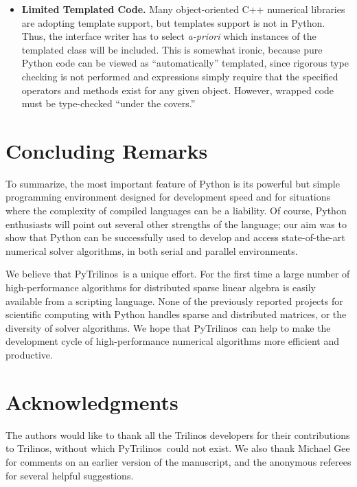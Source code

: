 \documentclass[acmtocl]{acmtrans2m}
\newcommand{\PyTrilinos}{{PyTrilinos}}
\begin{document}
\begin{itemize}
\item {\bf Limited Templated Code.} Many object-oriented C++ numerical
  libraries are adopting template support, but
  templates support is not in Python.  Thus, the interface
  writer has to select {\sl a-priori} which instances of the templated
  class will be included.  This is somewhat ironic, because pure
  Python code can be viewed as ``automatically'' templated, since
  rigorous type checking is not performed and expressions simply
  require that the specified operators and methods exist for any given
  object.  However, wrapped code must be type-checked ``under the
  covers.'' 

\end{itemize}

\section{Concluding Remarks}
\label{sec:concluding}

To summarize, the most important feature of Python is its powerful but
simple programming environment designed for development speed and for
situations where the complexity of compiled languages can be a
liability.  Of course, Python enthusiasts will point out several other
strengths of the language; our aim was to show that Python can be
successfully used to develop and access state-of-the-art numerical
solver algorithms, in both serial and parallel environments.

We believe that \PyTrilinos\ is a unique effort. For the first time
a large number of high-performance algorithms for distributed sparse
linear algebra is easily available from a scripting language.  None
of the previously reported projects for scientific computing with
Python handles sparse and distributed matrices, or the diversity of
solver algorithms.  We hope that \PyTrilinos\ can help to make the
development cycle of high-performance numerical algorithms more
efficient and productive.

\bigskip

\section*{Acknowledgments}
\label{sec:acks}

The authors would like to thank all the Trilinos developers for their
contributions to Trilinos, without which \PyTrilinos\ could not exist.
We also thank Michael Gee for comments on an earlier version of the
manuscript, and the anonymous referees for several helpful suggestions.



\end{document}
